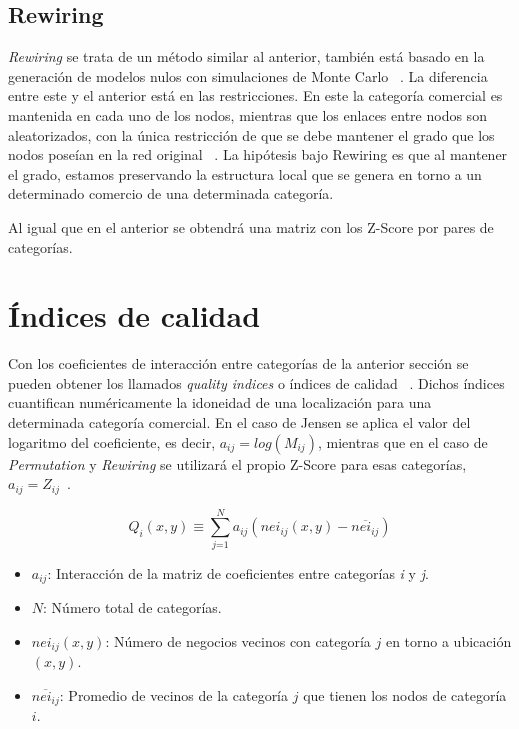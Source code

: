 
\subsection{Rewiring}

\textit{Rewiring} se trata de un método similar al anterior, también está basado en la generación de modelos nulos con simulaciones de Monte Carlo ~\cite{Montecarlo}. La diferencia entre este y el anterior está en las restricciones. En este la categoría comercial es mantenida en cada uno de los nodos, mientras que los enlaces entre nodos son aleatorizados, con la única restricción de que se debe mantener el grado que los nodos poseían en la red original ~\cite{Ahedo2021,RSVAJSSHJG}. La hipótesis bajo Rewiring es que al mantener el grado, estamos preservando la estructura local que se genera en torno a un determinado comercio de una determinada categoría.

Al igual que en el anterior se obtendrá una matriz con los Z-Score por pares de categorías.



\section{Índices de calidad}

Con los coeficientes de interacción entre categorías de la anterior sección se pueden obtener los llamados \textit{quality indices} o índices de calidad ~\cite{Ahedo2021,Jensen2006,RSVAJSSHJG}. Dichos índices cuantifican numéricamente la idoneidad de una localización para una determinada categoría comercial. En el caso de Jensen se aplica el valor del logaritmo del coeficiente, es decir, $a_{ij} = log(M_{ij})$, mientras que en el caso de \textit{Permutation} y \textit{Rewiring} se utilizará el propio Z-Score para esas categorías, $a_{ij} = Z_{ij}$~\cite{Ahedo2021}. 

\begin{equation*}
	Q_i(x,y) \equiv \sum_\textit{j=1}^N a_{ij} (nei_{ij}(x,y) - \overline{nei_{ij}})
\end{equation*}



\begin{itemize}
	\item $a_{ij}$: Interacción de la matriz de coeficientes entre categorías \textit{i} y \textit{j}.
	\item $N$: Número total de categorías.
	\item $nei_{ij}(x,y)$: Número de negocios vecinos con categoría $j$ en torno a ubicación $(x,y)$.
	\item $\overline{nei_{ij}}$: Promedio de vecinos de la categoría $j$ que tienen los nodos de categoría $i$.
\end{itemize}

